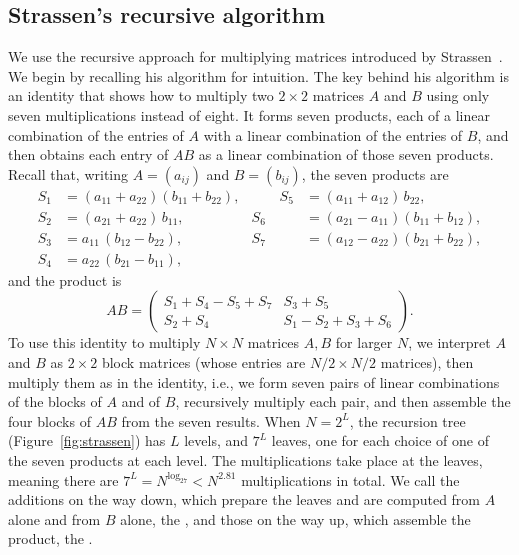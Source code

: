 \subsection{Strassen's recursive algorithm}\label{sec:background}

We use the recursive approach for multiplying matrices introduced by Strassen~\cite{Str69}. We begin by recalling his algorithm for intuition. The key behind his algorithm is an identity that shows how to multiply two $2\times2$ matrices $A$ and $B$ using only seven multiplications instead of eight. It forms seven products, each of a linear combination of the entries of $A$ with a linear combination of the entries of $B$, and then obtains each entry of $AB$ as a linear combination of those seven products. Recall that, writing $A=(a_{ij})$ and $B=(b_{ij})$, the seven products are
\begin{equation}\label{eq:strassen}
\begin{alignedat}{2}
S_1&=(a_{11}+a_{22})(b_{11}+b_{22}), &\qquad S_5&=(a_{11}+a_{12})\,b_{22},\\
S_2&=(a_{21}+a_{22})\,b_{11}, & S_6&=(a_{21}-a_{11})(b_{11}+b_{12}),\\
S_3&=a_{11}\,(b_{12}-b_{22}), & S_7&=(a_{12}-a_{22})(b_{21}+b_{22}),\\
S_4&=a_{22}\,(b_{21}-b_{11}),
\end{alignedat}
\end{equation}
and the product is
\[
AB=\begin{pmatrix} S_1+S_4-S_5+S_7 & S_3+S_5\\ S_2+S_4 & S_1-S_2+S_3+S_6\end{pmatrix}.
\]
To use this identity to multiply $N \times N$ matrices $A, B$ for larger $N$, we interpret $A$ and $B$ as $2\times2$ block matrices (whose entries are $N/2 \times N/2$ matrices), then multiply them as in the identity, i.e., we form seven pairs of linear combinations of the blocks of $A$ and of $B$, recursively multiply each pair, and then assemble the four blocks of $AB$ from the seven results. When $N=2^L$, the recursion tree (Figure~\ref{fig:strassen}) has $L$ levels, and $7^L$ leaves, one for each choice of one of the seven products at each level. The multiplications take place at the leaves, meaning there are $7^L=N^{\log_27} < N^{2.81}$ multiplications in total. We call the additions on the way down, which prepare the leaves and are computed from $A$ alone and from $B$ alone, the , and those on the way up, which assemble the product, the .

